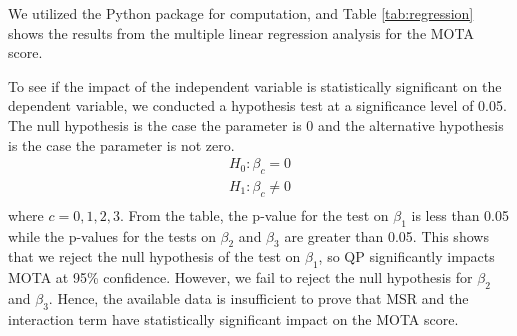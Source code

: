 We utilized the Python package \cite{seabold_statsmodels_2010} for computation, and Table \ref{tab:regression} shows the results from the multiple linear regression analysis for the MOTA score.

To see if the impact of the independent variable is statistically significant on the dependent variable, we conducted a hypothesis test at a significance level of 0.05. The null hypothesis is the case the parameter is 0 and the alternative hypothesis is the case the parameter is not zero.
\begin{equation}
    \begin{aligned}
        H_0: \beta_c = 0 \\
        H_1: \beta_c \neq 0 \\
    \end{aligned}
\end{equation}
where $c=0,1,2,3$. From the table, the p-value for the test on $\beta_1$ is less than 0.05 while the p-values for the tests on $\beta_2$ and $\beta_3$ are greater than 0.05. This shows that we reject the null hypothesis of the test on $\beta_1$, so QP significantly impacts MOTA at 95\% confidence. However, we fail to reject the null hypothesis for $\beta_2$ and $\beta_3$. Hence, the available data is insufficient to prove that MSR and the interaction term have statistically significant impact on the MOTA score.

